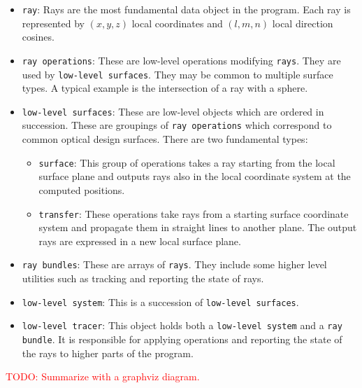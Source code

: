 \begin{itemize}
\item \lstinline{ray}: Rays are the most fundamental data object in the
program.  Each ray is represented by $(x, y , z)$ local coordinates and $(l, m,
n)$ local direction cosines.
\item \lstinline{ray operations}: These are low-level operations modifying
\lstinline{rays}.  They are used by \lstinline{low-level surfaces}. They may be
common to multiple surface types. A typical example is the intersection of a
ray with a sphere.
\item \lstinline{low-level surfaces}: These are low-level objects which are
ordered in succession. These are groupings of \lstinline{ray operations} which
correspond to common optical design surfaces. There are two fundamental types:
\begin{itemize}
\item \lstinline{surface}: This group of operations takes a ray starting from
the local surface plane and outputs rays also in the local coordinate system at
the computed positions.
\item \lstinline{transfer}: These operations take rays from a starting surface
coordinate system and propagate them in straight lines to another plane.  The
output rays are expressed in a new local surface plane.
\end{itemize}
\item \lstinline{ray bundles}: These are arrays of \lstinline{rays}. They
include some higher level utilities such as tracking and reporting the state of
rays.
\item \lstinline{low-level system}: This is a succession of
\lstinline{low-level surfaces}.
\item \lstinline{low-level tracer}: This object holds both a
\lstinline{low-level system} and a \lstinline{ray bundle}. It is responsible
for applying operations and reporting the state of the rays to higher parts
of the program.
\end{itemize}

\textcolor{red}{TODO: Summarize with a graphviz diagram.}
